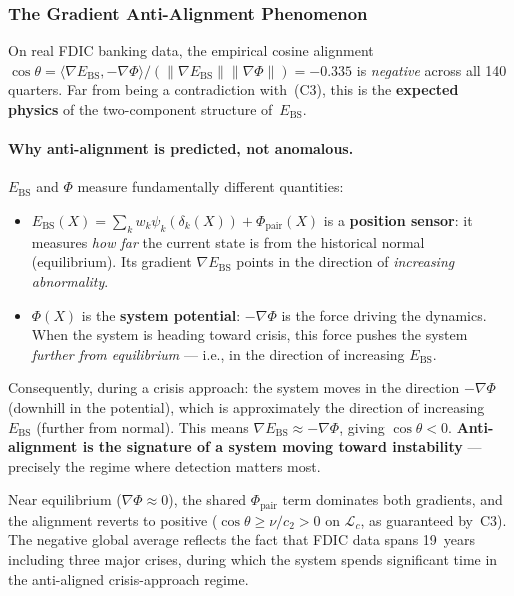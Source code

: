 \documentclass[11pt,a4paper]{article}
\newcommand{\Ebs}{E_{\mathrm{BS}}}
\newcommand{\grad}{\nabla}
\begin{document}
\subsubsection{The Gradient Anti-Alignment Phenomenon}

On real FDIC banking data, the empirical cosine alignment
$\cos\theta = \langle \grad\Ebs, -\grad\Phi \rangle /
(\|\grad\Ebs\|\|\grad\Phi\|) = {-}0.335$ is \emph{negative}
across all 140 quarters.  Far from being a contradiction
with~(C3), this is the \textbf{expected physics} of the
two-component structure of~$\Ebs$.

\paragraph{Why anti-alignment is predicted, not anomalous.}
$\Ebs$ and $\Phi$ measure fundamentally different quantities:
\begin{itemize}[nosep]
  \item $\Ebs(X) = \sum_k w_k \psi_k(\delta_k(X)) + \Phi_{\mathrm{pair}}(X)$
    is a \textbf{position sensor}: it measures \emph{how far} the
    current state is from the historical normal (equilibrium).  Its
    gradient $\grad\Ebs$ points in the direction of \emph{increasing
    abnormality}.
  \item $\Phi(X)$ is the \textbf{system potential}: $-\grad\Phi$ is
    the force driving the dynamics.  When the system is heading toward
    crisis, this force pushes the system \emph{further from equilibrium}
    --- i.e., in the direction of increasing $\Ebs$.
\end{itemize}
Consequently, during a crisis approach: the system moves in the
direction $-\grad\Phi$ (downhill in the potential), which is
approximately the direction of increasing $\Ebs$ (further from
normal).  This means $\grad\Ebs \approx -\grad\Phi$, giving
$\cos\theta < 0$.  \textbf{Anti-alignment is the signature of a
system moving toward instability} --- precisely the regime where
detection matters most.

Near equilibrium ($\grad\Phi \approx 0$), the shared
$\Phi_{\mathrm{pair}}$ term dominates both gradients, and the
alignment reverts to positive ($\cos\theta \ge \nu/c_2 > 0$ on
$\mathcal{L}_c$, as guaranteed by~C3).  The negative global
average reflects the fact that FDIC data spans 19~years
including three major crises, during which the system spends
significant time in the anti-aligned crisis-approach regime.
\end{document}

